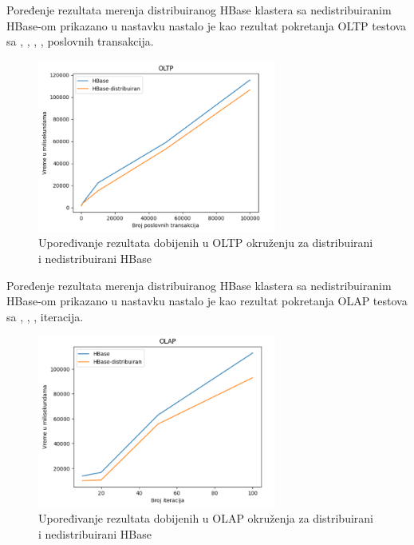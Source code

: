 \documentclass[12pt,oneside]{memoir}
\begin{document}
Poređenje rezultata merenja distribuiranog HBase klastera sa nedistribuiranim HBase-om  prikazano u nastavku nastalo je kao rezultat pokretanja OLTP testova sa , , , ,  poslovnih transakcija.

\begin{figure}[!ht]
  \centering
  \includegraphics[width=0.7\textwidth]{dist-results.png}
  \caption{Upoređivanje rezultata dobijenih u OLTP okruženju za distribuirani i nedistribuirani HBase}
  \label{fig:grafikon}
\end{figure}

\pagebreak

Poređenje rezultata merenja distribuiranog HBase klastera sa nedistribuiranim HBase-om prikazano u nastavku nastalo je kao rezultat pokretanja OLAP testova sa , , ,  iteracija.

\begin{figure}[!ht]
  \centering
  \includegraphics[width=0.7\textwidth]{dist-olap.png}
  \caption{Upoređivanje rezultata dobijenih u OLAP okruženja za distribuirani i nedistribuirani HBase }
  \label{fig:grafikon}
\end{figure}
\end{document}
